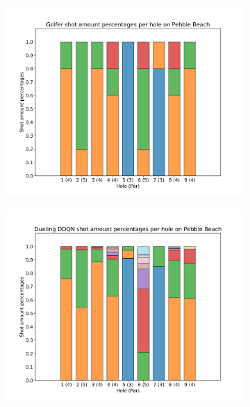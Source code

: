 \documentclass{kththesis}
\begin{document}
\begin{figure}
    \centering
    \begin{subfigure}{\textwidth}
    \centering
    \includegraphics[height=0.3\textheight]{L2Percentages/L2_Shot_Percentages_Pebble.png} 
    \end{subfigure}
    \begin{subfigure}{\textwidth}
    \centering
    \includegraphics[height=0.3\textheight]{AgentPercentages/DDDQN_Shot_Percentages_Pebble.png} 
    \end{subfigure}
    \begin{subfigure}{\textwidth}

\end{subfigure}
\end{figure}
\end{document}
